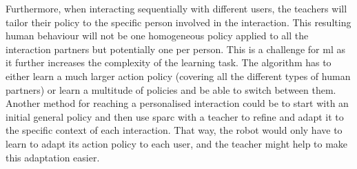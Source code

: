 Furthermore, when interacting sequentially with different users, the teachers will tailor their policy to the specific person involved in the interaction. This resulting human behaviour will not be one homogeneous policy applied to all the interaction partners but potentially one per person. 
This is a challenge for \gls{ml} as it further increases the complexity of the learning task. The algorithm has to either learn a much larger action policy (covering all the different types of human partners) or learn a multitude of policies and be able to switch between them. Another method for reaching a personalised interaction could be to start with an initial general policy and then use \gls{sparc} with a teacher to refine and adapt it to the specific context of each interaction. That way, the robot would only have to learn to adapt its action policy to each user, and the teacher might help to make this adaptation easier.



